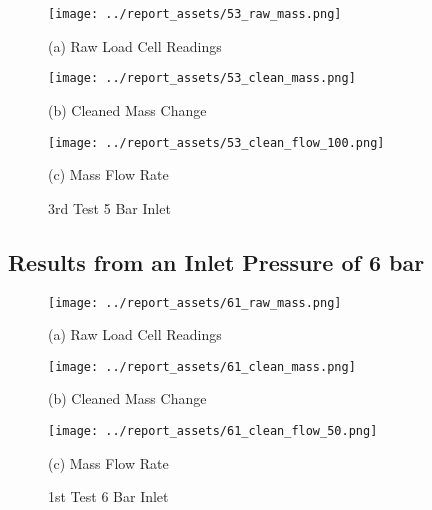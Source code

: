\begin{figure}[htbp]
    \centering

    \begin{minipage}{0.32\textwidth}
        \centering
        \texttt{[image: ../report\_assets/53\_raw\_mass.png]}
        \caption*{(a) Raw Load Cell Readings}
    \end{minipage}
    \hfill
    \begin{minipage}{0.32\textwidth}
        \centering
        \texttt{[image: ../report\_assets/53\_clean\_mass.png]}
        \caption*{(b) Cleaned Mass Change}
    \end{minipage}
    \hfill
    \begin{minipage}{0.32\textwidth}
        \centering
        \texttt{[image: ../report\_assets/53\_clean\_flow\_100.png]}
        \caption*{(c) Mass Flow Rate}
    \end{minipage}
    \caption{3rd Test 5 Bar Inlet}
    
\end{figure}\label{fig:53}
\vfill
\newpage

\subsection{Results from an Inlet Pressure of 6 bar}
\vfill
\begin{figure}[htbp]
    \centering

    \begin{minipage}{0.32\textwidth}
        \centering
        \texttt{[image: ../report\_assets/61\_raw\_mass.png]}
        \caption*{(a) Raw Load Cell Readings}
    \end{minipage}
    \hfill
    \begin{minipage}{0.32\textwidth}
        \centering
        \texttt{[image: ../report\_assets/61\_clean\_mass.png]}
        \caption*{(b) Cleaned Mass Change}
    \end{minipage}
    \hfill
    \begin{minipage}{0.32\textwidth}
        \centering
        \texttt{[image: ../report\_assets/61\_clean\_flow\_50.png]}
        \caption*{(c) Mass Flow Rate}
    \end{minipage}
    \caption{1st Test 6 Bar Inlet}
    
\end{figure}\label{fig:61}

